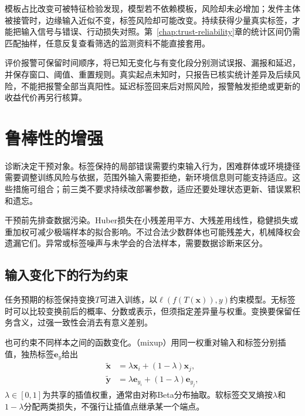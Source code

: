 模板占比改变可被特征检验发现，模型若不依赖模板，风险却未必增加；发件主体被接管时，边缘输入近似不变，标签风险却可能改变。持续获得少量真实标签，才能把输入信号与错误、行动损失对照。第~\ref{chap:trust-reliability}章的统计区间仍需匹配抽样，任意反复查看筛选的监测资料不能直接套用。

评价报警可保留时间顺序，将已知无变化与有变化段分别测试误报、漏报和延迟，并保存窗口、阈值、重置规则。真实起点未知时，只报告已核实统计差异及后续风险，不能把报警全部当真阳性。延迟标签回来后对照风险，报警触发拒绝或更新的收益代价再另行核算。

\section{鲁棒性的增强}
\label{sec:robustness-enhancement}

诊断决定干预对象。标签保持的局部错误需要约束输入行为，困难群体或环境捷径需要调整训练风险与依据，范围外输入需要拒绝，新环境信息则可能支持适应。这些措施可组合；前三类不要求持续改部署参数，适应还要处理状态更新、错误累积和遗忘。

干预前先排查数据污染。Huber损失在小残差用平方、大残差用线性，稳健损失或重加权可减少极端样本的拟合影响。不过合法少数群体也可能残差大，机械降权会遗漏它们。异常或标签噪声与未学会的合法样本，需要数据诊断来区分。

\subsection{输入变化下的行为约束}
\label{sec:robustness-local-enhancement}

任务预期的标签保持变换$T$可进入训练，以$\ell(f(T(\bm{x})),y)$约束模型。无标签时可以比较变换前后的概率、分数或表示，但须指定差异量与权重。变换要保留任务含义，过强一致性会消去有意义差别。

也可约束不同样本之间的函数变化。（mixup）用同一权重对输入和标签分别插值，独热标签$\bm{e}_y$给出
\begin{equation}
 \begin{aligned}
  \widetilde{\bm{x}}&=\lambda\bm{x}_i+(1-\lambda)\bm{x}_j,\\
  \widetilde{\bm{y}}&=\lambda\bm{e}_{y_i}
                         +(1-\lambda)\bm{e}_{y_j},
 \end{aligned}
 \label{eq:robustness-mixup}
\end{equation}
$\lambda\in[0,1]$为共享的插值权重，通常由对称Beta分布抽取。软标签交叉熵按$\lambda$和$1-\lambda$分配两类损失，不强行让插值点继承某一个端点。

